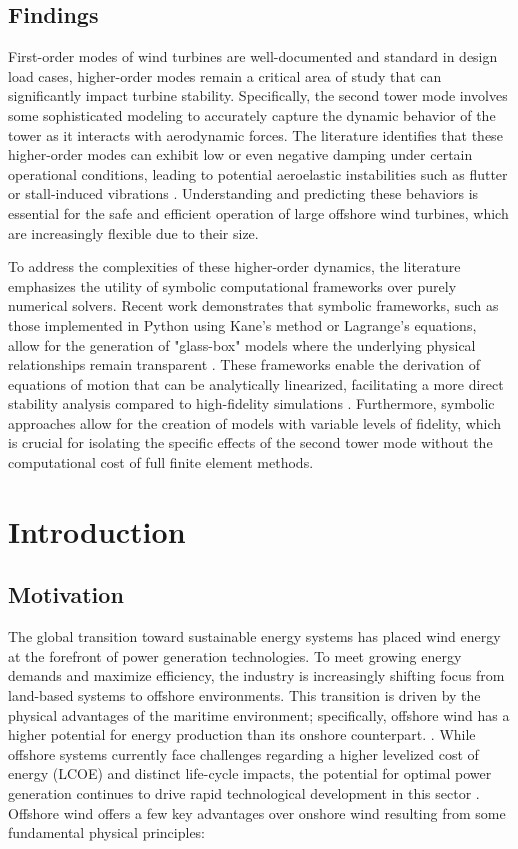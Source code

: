 \documentclass[onecolumn,draftcls]{IEEEtran}
\begin{document}
\subsection*{Findings}
First-order modes of wind turbines are well-documented and standard in design load cases, higher-order modes remain a critical area of study that can significantly impact turbine stability. Specifically, the second tower mode involves some sophisticated modeling to accurately capture the dynamic behavior of the tower as it interacts with aerodynamic forces. The literature identifies that these higher-order modes can exhibit low or even negative damping under certain operational conditions, leading to potential aeroelastic instabilities such as flutter or stall-induced vibrations \cite{hansen2007aeroelastic}. Understanding and predicting these behaviors is essential for the safe and efficient operation of large offshore wind turbines, which are increasingly flexible due to their size.

To address the complexities of these higher-order dynamics, the literature emphasizes the utility of symbolic computational frameworks over purely numerical solvers. Recent work demonstrates that symbolic frameworks, such as those implemented in Python using Kane's method or Lagrange's equations, allow for the generation of "glass-box" models where the underlying physical relationships remain transparent \cite{branlard2022symbolic}. These frameworks enable the derivation of equations of motion that can be analytically linearized, facilitating a more direct stability analysis compared to high-fidelity simulations \cite{branlard2022symbolic}. Furthermore, symbolic approaches allow for the creation of models with variable levels of fidelity, which is crucial for isolating the specific effects of the second tower mode without the computational cost of full finite element methods.


\newpage

\section{Introduction}
\subsection*{Motivation}
The global transition toward sustainable energy systems has placed wind energy at the forefront of power generation technologies. To meet growing energy demands and maximize efficiency, the industry is increasingly shifting focus from land-based systems to offshore environments. This transition is driven by the physical advantages of the maritime environment; specifically, offshore wind has a higher potential for energy production than its onshore counterpart. \cite{Desalegn2023onshore}. While offshore systems currently face challenges regarding a higher levelized cost of energy (LCOE) and distinct life-cycle impacts, the potential for optimal power generation continues to drive rapid technological development in this sector \cite{Desalegn2023onshore}. Offshore wind offers a few key advantages over onshore wind resulting from some fundamental physical principles:
\end{document}
